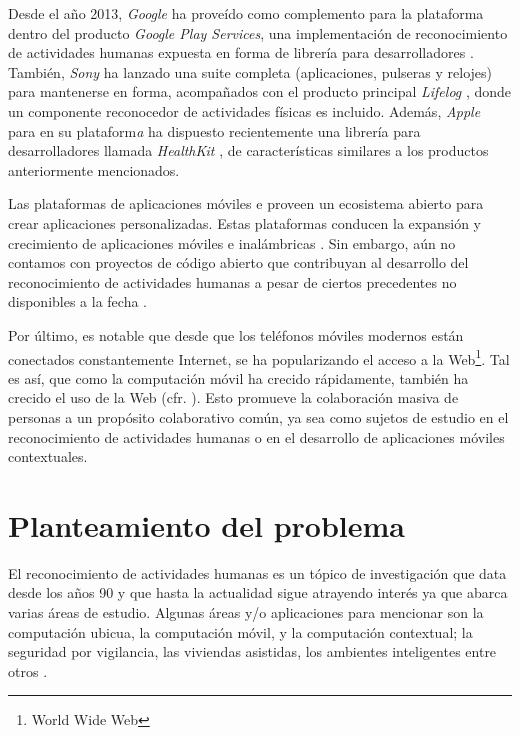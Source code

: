Desde el año 2013, \emph{Google} ha proveído como complemento para
la plataforma \emph{ }\cite{Google2005a} dentro del
producto \emph{Google Play Services}, una implementación de reconocimiento
de actividades humanas expuesta en forma de librería para desarrolladores
\cite{Google2013l}. También, \emph{Sony} ha lanzado una suite completa
(aplicaciones, pulseras y relojes) para mantenerse en forma, acompañados
con el producto principal \emph{Lifelog} \cite{Sony2016l}, donde
un componente reconocedor de actividades físicas es incluido. Además,
\emph{Apple} para en su plataform\emph{a } \cite{Apple2007i}
ha dispuesto recientemente una librería para desarrolladores llamada
\emph{HealthKit} \cite{Apple2016h}, de características similares
a los productos anteriormente mencionados. 

Las plataformas de aplicaciones móviles \emph{} e \emph{}
proveen un ecosistema abierto para crear aplicaciones personalizadas.
Estas plataformas conducen la expansión y crecimiento de aplicaciones
móviles e inalámbricas \cite{Tanenbaum2010}. Sin embargo, aún no
contamos con proyectos de código abierto que contribuyan al desarrollo
del reconocimiento de actividades humanas a pesar de ciertos precedentes
no disponibles a la fecha \cite{Kwapisz2011,LaraLabrador2013}.

Por último, es notable que desde que los teléfonos móviles modernos
están conectados constantemente Internet, se ha popularizando el acceso
a la Web\footnote{World Wide Web}. Tal es así, que como la computación
móvil ha crecido rápidamente, también ha crecido el uso de la Web
(cfr. \cite{NYTimes2008iph}). Esto promueve la colaboración masiva
de personas a un propósito colaborativo común, ya sea como sujetos
de estudio en el reconocimiento de actividades humanas o en el desarrollo
de aplicaciones móviles contextuales.

\section{Planteamiento del problema}

\label{planteamiento}

El reconocimiento de actividades humanas es un tópico de investigación
que data desde los años 90 y que hasta la actualidad sigue atrayendo
interés ya que abarca varias áreas de estudio. Algunas áreas y/o aplicaciones
para mencionar son la computación ubicua, la computación móvil, y
la computación contextual; la seguridad por vigilancia, las viviendas
asistidas, los ambientes inteligentes entre otros \cite{Chen2012}. 

